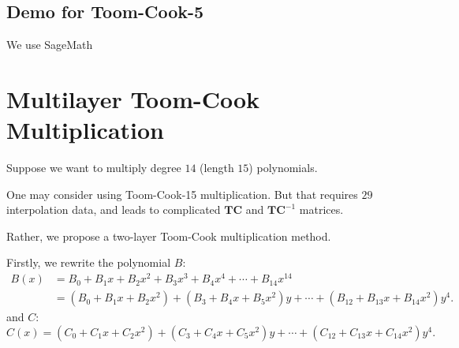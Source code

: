 \documentclass[
11pt,notheorems,hyperref={pdfauthor=whatever}
]{beamer}
\begin{document}
\subsection{Demo for Toom-Cook-5}

\begin{frame}
    We use SageMath
\end{frame}

\section{Multilayer Toom-Cook Multiplication}

\begin{frame}
    Suppose we want to multiply degree $14$ (length $15$) polynomials.

    One may consider using Toom-Cook-15 multiplication.
    But that requires $29$ interpolation data, and leads to complicated $\mathbf{TC}$ and $\mathbf{TC}^{-1}$ matrices.

    Rather, we propose a two-layer Toom-Cook multiplication method.
\end{frame}

\begin{frame}
    Firstly, we rewrite the polynomial $B$:
    \[
    \begin{aligned}
        B(x) &= B_{0} + B_{1}x + B_{2}x^{2} + B_{3} x^{3} + B_{4} x^{4} + \cdots + B_{14}x^{14}
        \\
        &= \left( B_{0} + B_{1} x + B_{2} x^2 \right) + \left( B_{3} + B_{4} x + B_{5} x^2 \right)y + \cdots + \left( B_{12} + B_{13} x + B_{14} x^2 \right)y^4.
    \end{aligned}
    \]
    and $C$:
    \[
    C(x) = \left( C_{0} + C_{1} x + C_{2} x^2 \right) + \left( C_{3} + C_{4} x + C_{5} x^2 \right)y + \cdots + \left( C_{12} + C_{13} x + C_{14} x^2 \right)y^4.
    \]
\end{frame}
\end{document}
